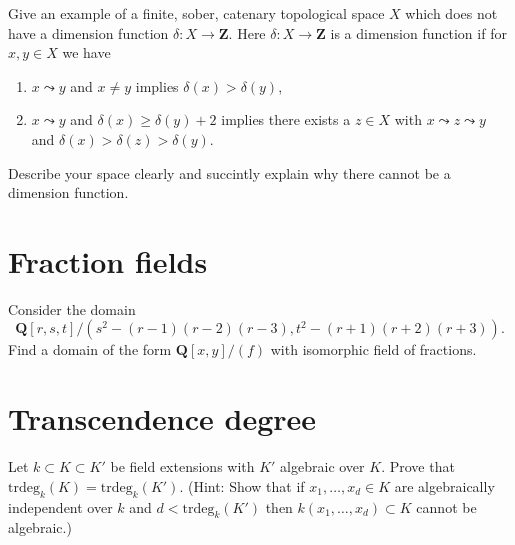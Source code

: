 \begin{exercise}
\label{exercise-example-no-dim-function}
Give an example of a finite, sober, catenary topological space
$X$ which does not have a dimension function $\delta : X \to \mathbf{Z}$.
Here $\delta : X \to \mathbf{Z}$ is a dimension function if
for $x, y \in X$ we have
\begin{enumerate}
\item $x \leadsto y$ and $x \not = y$ implies $\delta(x) > \delta(y)$,
\item $x \leadsto y$ and $\delta(x) \geq \delta(y) + 2$ implies
there exists a $z \in X$ with $x \leadsto z \leadsto y$ and
$\delta(x) > \delta(z) > \delta(y)$.
\end{enumerate}
Describe your space clearly and succintly explain why there
cannot be a dimension function.
\end{exercise}




\section{Fraction fields}
\label{section-fraction-fields}

\begin{exercise}
\label{exercise-find-fraction-field}
Consider the domain
$$
{\mathbf Q}[r, s, t]/(s^2-(r-1)(r-2)(r-3), t^2-(r + 1)(r + 2)(r + 3)).
$$
Find a domain of the form ${\mathbf Q}[x, y]/(f)$ with isomorphic
field of fractions.
\end{exercise}



\section{Transcendence degree}
\label{section-transcendence}

\begin{exercise}
\label{exercise-algebraic-extension}
Let $k \subset K \subset K'$ be field extensions with $K'$
algebraic over $K$. Prove that $\text{trdeg}_k(K) = \text{trdeg}_k(K')$.
(Hint: Show that if $x_1, \ldots, x_d \in K$ are algebraically independent
over $k$ and $d < \text{trdeg}_k(K')$ then $k(x_1, \ldots, x_d) \subset K$
cannot be algebraic.)
\end{exercise}

